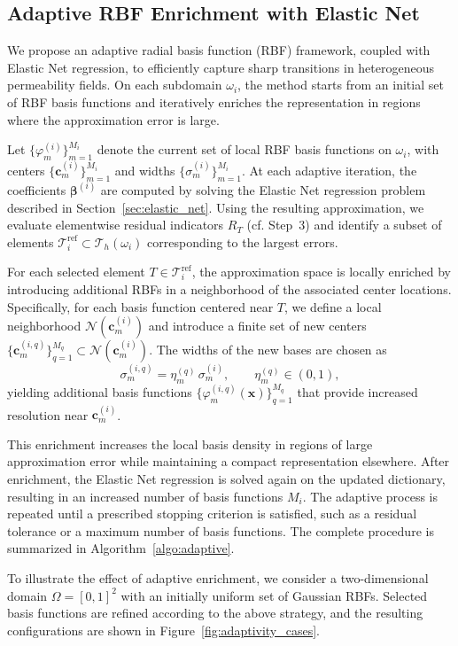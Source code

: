 \documentclass[final,1p,times]{elsarticle}
\theoremstyle{plain}
\theoremstyle{definition}
\theoremstyle{remark}
\newcommand{\bx}{\mathbf{x}}
\newcommand{\bc}{\mathbf{c}}
\begin{document}
\subsection{Adaptive RBF Enrichment with Elastic Net}


We propose an adaptive radial basis function (RBF) framework, coupled with Elastic Net regression, to efficiently capture sharp transitions in heterogeneous permeability fields. On each subdomain $\omega_i$, the method starts from an initial set of RBF basis functions and iteratively enriches the representation in regions where the approximation error is large.

Let $\{\varphi_m^{(i)}\}_{m=1}^{M_i}$ denote the current set of local RBF basis functions on $\omega_i$, with centers $\{\bc_m^{(i)}\}_{m=1}^{M_i}$ and widths $\{\sigma_m^{(i)}\}_{m=1}^{M_i}$. At each adaptive iteration, the coefficients $\boldsymbol{\beta}^{(i)}$ are computed by solving the Elastic Net regression problem described in Section~\ref{sec:elastic_net}. Using the resulting approximation, we evaluate elementwise residual indicators $R_T$ (cf. Step~3) and identify a subset of elements $\mathcal{T}_i^{\mathrm{ref}} {\subset \mathcal{T}_h(\omega_i)}$ corresponding to the largest errors.

For each selected element $T \in \mathcal{T}_i^{\mathrm{ref}}$, the approximation space is locally enriched by introducing additional RBFs in a neighborhood of the associated center locations. Specifically, for each basis function centered near $T$, we define a local neighborhood $\mathcal{N}(\bc_m^{(i)})$ and introduce a finite set of new centers $\{\bc_m^{(i,q)}\}_{q=1}^{M_q} \subset \mathcal{N}(\bc_m^{(i)})$. The widths of the new bases are chosen as
$$
\sigma_m^{(i,q)} = \eta_m^{(q)} \, \sigma_m^{(i)}, \qquad \eta_m^{(q)} \in (0,1),
$$
yielding additional basis functions $\{\varphi_m^{(i,q)}(\bx)\}_{q=1}^{M_q}$ that provide increased resolution near $\bc_m^{(i)}$.

This enrichment increases the local basis density in regions of large approximation error while maintaining a compact representation elsewhere. After enrichment, the Elastic Net regression is solved again on the updated dictionary, resulting in an increased number of basis functions $M_i$. The adaptive process is repeated until a prescribed stopping criterion is satisfied, such as a residual tolerance or a maximum number of basis functions. The complete procedure is summarized in Algorithm~\ref{algo:adaptive}.

To illustrate the effect of adaptive enrichment, we consider a two-dimensional domain $\Omega = [0,1]^2$ with an initially uniform set of Gaussian RBFs. Selected basis functions are refined according to the above strategy, and the resulting
configurations are shown in Figure~\ref{fig:adaptivity_cases}.
\end{document}
